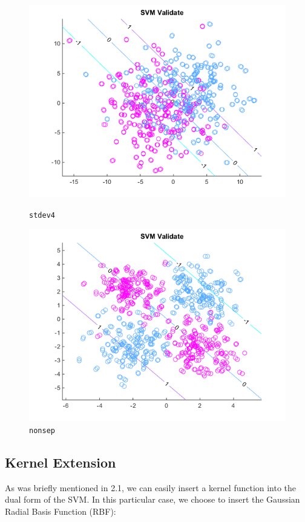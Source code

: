 \documentclass[10pt,letterpaper]{article}
\begin{document}
\begin{center}
\begin{figure}[!htb]
  \includegraphics[width=\linewidth]{figures/stdev4.png}
  \caption{\texttt{stdev4}}
\endminipage\hfill
{}
  \includegraphics[width=\linewidth]{figures/nonsep.png}
  \caption{\texttt{nonsep}}\label{fig:nonsep}
\endminipage
\end{figure}
\end{center}

\subsection{Kernel Extension}
As was briefly mentioned in 2.1, we can easily insert a kernel function into the dual form of the SVM. In this particular case, we choose to insert the Gaussian Radial Basis Function (RBF):
\end{document}
